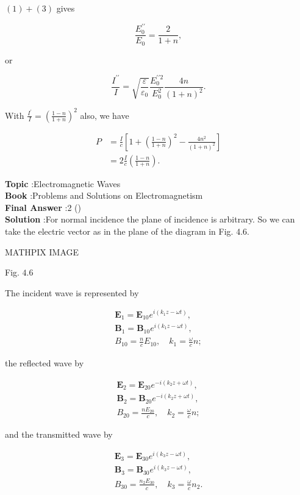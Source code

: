 \documentclass[10pt]{article}
\begin{document}
$(1)+(3)$ gives

$$
\frac{E_{0}^{\prime \prime}}{E_{0}}=\frac{2}{1+n},
$$

or

$$
\frac{I^{\prime \prime}}{I}=\sqrt{\frac{\varepsilon}{\varepsilon_{0}}} \frac{E_{0}^{\prime \prime 2}}{E_{0}^{2}} \frac{4 n}{(1+n)^{2}} .
$$

With $\frac{I^{\prime}}{I}=\left(\frac{1-n}{1+n}\right)^{2}$ also, we have

$$
\begin{aligned}
P &=\frac{I}{c}\left[1+\left(\frac{1-n}{1+n}\right)^{2}-\frac{4 n^{2}}{(1+n)^{2}}\right] \\
&=2 \frac{I}{c}\left(\frac{1-n}{1+n}\right) .
\end{aligned}
$$

\textbf{Topic} :Electromagnetic Waves\\
\textbf{Book} :Problems and Solutions on Electromagnetism\\
\textbf{Final Answer} :2 \left(\right)\\


\textbf{Solution} :For normal incidence the plane of incidence is arbitrary. So we can take the electric vector as in the plane of the diagram in Fig. 4.6.

MATHPIX IMAGE

Fig. $4.6$

The incident wave is represented by

$$
\begin{gathered}
\mathbf{E}_{1}=\mathbf{E}_{10} e^{i\left(k_{1} z-\omega t\right)}, \\
\mathbf{B}_{1}=\mathbf{B}_{10} e^{i\left(k_{1} z-\omega t\right)}, \\
B_{10}=\frac{n}{c} E_{10}, \quad k_{1}=\frac{\omega}{c} n ;
\end{gathered}
$$

the reflected wave by

$$
\begin{gathered}
\mathbf{E}_{2}=\mathbf{E}_{20} e^{-i\left(k_{2} z+\omega t\right)}, \\
\mathbf{B}_{2}=\mathbf{B}_{20} e^{-i\left(k_{2} z+\omega t\right)}, \\
B_{20}=\frac{n E_{20}}{c}, \quad k_{2}=\frac{\omega}{c} n ;
\end{gathered}
$$

and the transmitted wave by

$$
\begin{gathered}
\mathbf{E}_{3}=\mathbf{E}_{30} e^{i\left(k_{3} z-\omega t\right)}, \\
\mathbf{B}_{3}=\mathbf{B}_{30} e^{i\left(k_{3} z-\omega t\right)}, \\
B_{30}=\frac{n_{2} E_{30}}{c}, \quad k_{3}=\frac{\omega}{c} n_{2} .
\end{gathered}
$$
\end{document}
